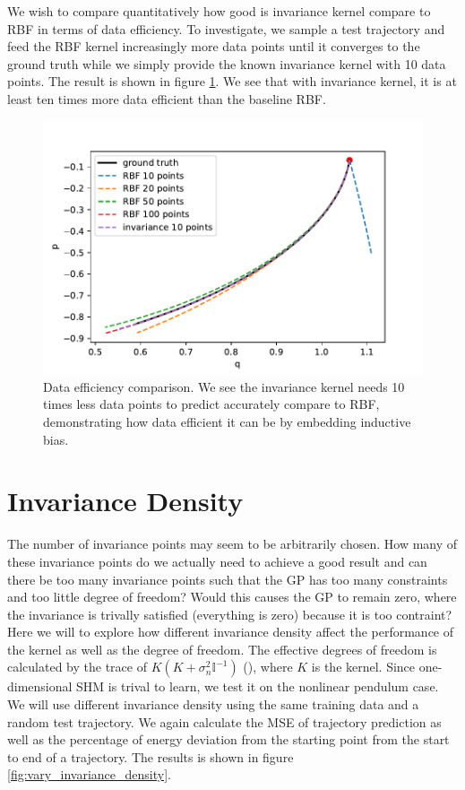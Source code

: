 \documentclass{statsmsc}
\begin{document}
We wish to compare quantitatively how good is invariance kernel compare to RBF in terms of data efficiency. 
To investigate, we sample a test trajectory and feed the RBF kernel increasingly more data points until it converges to the ground truth while we simply provide the known invariance kernel with 10 data points.
The result is shown in figure \ref{fig:data_efficiency}. 
We see that with invariance kernel, it is at least ten times more data efficient than the baseline RBF.

\begin{figure}[H] 
  \includegraphics[width=0.8\linewidth]{../codes/figures/data_efficiency.pdf}
  \centering
  \caption{Data efficiency comparison. We see the invariance kernel needs 10 times less data points to predict accurately compare to RBF, demonstrating how data efficient it can be by embedding inductive bias.}
  \label{fig:data_efficiency}
\end{figure}

\section{Invariance Density}
The number of invariance points may seem to be arbitrarily chosen. 
How many of these invariance points do we actually need to achieve a good result and can there be too many invariance points such that the GP has too many constraints and too little degree of freedom?
Would this causes the GP to remain zero, where the invariance is trivally satisfied (everything is zero) because it is too contraint?
Here we will to explore how different invariance density affect the performance of the kernel as well as the degree of freedom.
The effective degrees of freedom is calculated by the trace of $K(K+\sigma^2_n\mathbb{I}^{-1})$ (\cite{rasmussen_williams_2006}), where $K$ is the kernel.
Since one-dimensional SHM is trival to learn, we test it on the nonlinear pendulum case.
We will use different invariance density using the same training data and a random test trajectory.
We again calculate the MSE of trajectory prediction as well as the percentage of energy deviation from the starting point from the start to end of a trajectory.
The results is shown in figure \ref{fig:vary_invariance_density}.
\end{document}
